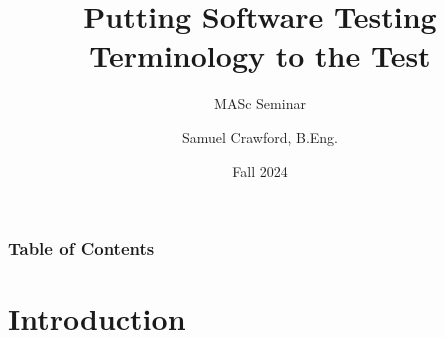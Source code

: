 \documentclass{beamer}
\title[MASc Seminar]{Putting Software Testing Terminology to the Test}
\subtitle{MASc Seminar}
\author{Samuel Crawford, B.Eng.}
\institute{McMaster University\\Department of Computing and Software}
\date{Fall 2024}
\begin{document}

\frame{\titlepage}


\begin{frame}
    \frametitle{Table of Contents}
    \tableofcontents
\end{frame}

\section{Introduction}
\end{document}
